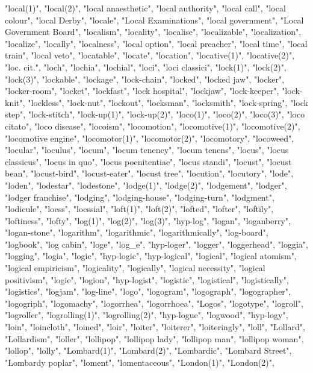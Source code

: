 "local(1)",
"local(2)",
"local anaesthetic",
"local authority",
"local call",
"local colour",
"local Derby",
"locale",
"Local Examinations",
"local government",
"Local Government Board",
"localism",
"locality",
"localise",
"localizable",
"localization",
"localize",
"locally",
"localness",
"local option",
"local preacher",
"local time",
"local train",
"local veto",
"locatable",
"locate",
"location",
"locative(1)",
"locative(2)",
"loc. cit.",
"loch",
"lochia",
"lochial",
"loci",
"loci classici",
"lock(1)",
"lock(2)",
"lock(3)",
"lockable",
"lockage",
"lock-chain",
"locked",
"locked jaw",
"locker",
"locker-room",
"locket",
"lockfast",
"lock hospital",
"lockjaw",
"lock-keeper",
"lock-knit",
"lockless",
"lock-nut",
"lockout",
"locksman",
"locksmith",
"lock-spring",
"lock step",
"lock-stitch",
"lock-up(1)",
"lock-up(2)",
"loco(1)",
"loco(2)",
"loco(3)",
"loco citato",
"loco disease",
"locoism",
"locomotion",
"locomotive(1)",
"locomotive(2)",
"locomotive engine",
"locomotor(1)",
"locomotor(2)",
"locomotory",
"locoweed",
"locular",
"loculus",
"locum",
"locum tenency",
"locum tenens",
"locus",
"locus classicus",
"locus in quo",
"locus poenitentiae",
"locus standi",
"locust",
"locust bean",
"locust-bird",
"locust-eater",
"locust tree",
"locution",
"locutory",
"lode",
"loden",
"lodestar",
"lodestone",
"lodge(1)",
"lodge(2)",
"lodgement",
"lodger",
"lodger franchise",
"lodging",
"lodging-house",
"lodging-turn",
"lodgment",
"lodicule",
"loess",
"loessial",
"loft(1)",
"loft(2)",
"lofted",
"lofter",
"loftily",
"loftiness",
"lofty",
"log(1)",
"log(2)",
"log(3)",
"hyp-log",
"logan",
"loganberry",
"logan-stone",
"logarithm",
"logarithmic",
"logarithmically",
"log-board",
"logbook",
"log cabin",
"loge",
"log_e",
"hyp-loger",
"logger",
"loggerhead",
"loggia",
"logging",
"logia",
"logic",
"hyp-logic",
"hyp-logical",
"logical",
"logical atomism",
"logical empiricism",
"logicality",
"logically",
"logical necessity",
"logical positivism",
"logie",
"logion",
"hyp-logist",
"logistic",
"logistical",
"logistically",
"logistics",
"logjam",
"log-line",
"logo",
"logogram",
"logograph",
"logographer",
"logogriph",
"logomachy",
"logorrhea",
"logorrhoea",
"Logos",
"logotype",
"logroll",
"logroller",
"logrolling(1)",
"logrolling(2)",
"hyp-logue",
"logwood",
"hyp-logy",
"loin",
"loincloth",
"loined",
"loir",
"loiter",
"loiterer",
"loiteringly",
"loll",
"Lollard",
"Lollardism",
"loller",
"lollipop",
"lollipop lady",
"lollipop man",
"lollipop woman",
"lollop",
"lolly",
"Lombard(1)",
"Lombard(2)",
"Lombardic",
"Lombard Street",
"Lombardy poplar",
"loment",
"lomentaceous",
"London(1)",
"London(2)",
